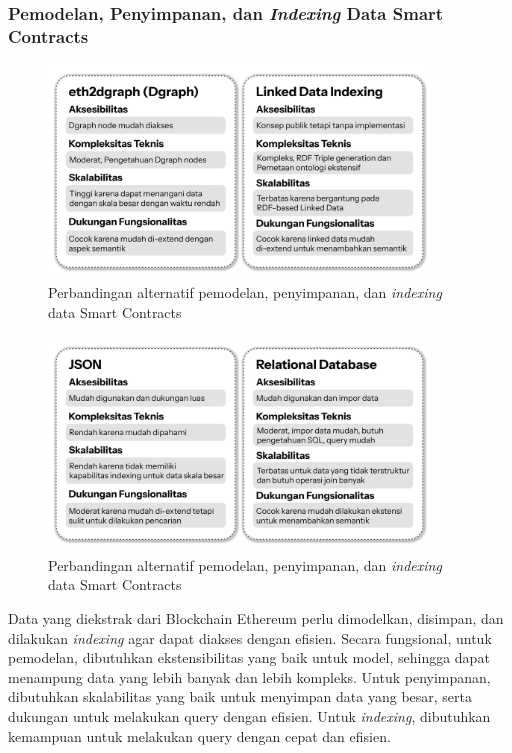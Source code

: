 \subsubsection{Pemodelan, Penyimpanan, dan \textit{Indexing} Data Smart Contracts}


\begin{figure}[ht]
	\centering
	\includegraphics[width=0.9\textwidth]{resources/chapter-3/pemodelan-1.png}
	\caption{Perbandingan alternatif pemodelan, penyimpanan, dan \textit{indexing} data Smart Contracts}
	\label{image:pemodelan-1}
\end{figure}

\begin{figure}[ht]
	\centering
	\includegraphics[width=0.9\textwidth]{resources/chapter-3/pemodelan-2.png}
	\caption{Perbandingan alternatif pemodelan, penyimpanan, dan \textit{indexing} data Smart Contracts}
	\label{image:pemodelan-2}
\end{figure}

Data yang diekstrak dari Blockchain Ethereum perlu dimodelkan, disimpan, dan dilakukan \textit{indexing} agar dapat diakses dengan efisien. Secara fungsional, untuk pemodelan, dibutuhkan ekstensibilitas yang baik untuk model, sehingga dapat menampung data yang lebih banyak dan lebih kompleks. Untuk penyimpanan, dibutuhkan skalabilitas yang baik untuk menyimpan data yang besar, serta dukungan untuk melakukan query dengan efisien. Untuk \textit{indexing}, dibutuhkan kemampuan untuk melakukan query dengan cepat dan efisien.

